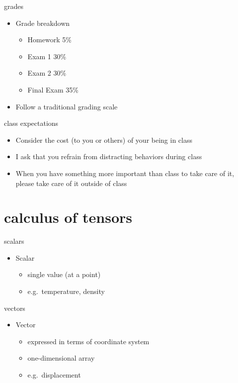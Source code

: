 \documentclass[
  letterpaper,
  ignorenonframetext,
  aspectratio=43,
  handout,
  12pt]{beamer}
\providecommand{\tightlist}{%
  \setlength{\itemsep}{0pt}\setlength{\parskip}{0pt}}
\providecommand{\tightlist}{%
\setlength{\itemsep}{0pt}\setlength{\parskip}{0pt}}
\begin{document}
\begin{frame}{grades}
\protect\hypertarget{grades}{}
\begin{itemize}
\tightlist
\item
  Grade breakdown

  \begin{itemize}
  \tightlist
  \item
    Homework 5\%
  \item
    Exam 1 30\%
  \item
    Exam 2 30\%
  \item
    Final Exam 35\%
  \end{itemize}
\item
  Follow a traditional grading scale
\end{itemize}
\end{frame}

\begin{frame}{class expectations}
\protect\hypertarget{class-expectations}{}
\begin{itemize}
\tightlist
\item
  Consider the cost (to you or others) of your being in class
\item
  I ask that you refrain from distracting behaviors during class
\item
  When you have something more important than class to take care of it,
  please take care of it outside of class
\end{itemize}
\end{frame}

\hypertarget{calculus-of-tensors}{%
\section{calculus of tensors}\label{calculus-of-tensors}}

\begin{frame}{scalars}
\protect\hypertarget{scalars}{}
\begin{itemize}
\tightlist
\item
  Scalar

  \begin{itemize}
  \tightlist
  \item
    single value (at a point)
  \item
    e.g.~temperature, density
  \end{itemize}
\end{itemize}
\end{frame}

\begin{frame}{vectors}
\protect\hypertarget{vectors}{}
\begin{itemize}
\tightlist
\item
  Vector

  \begin{itemize}
  \tightlist
  \item
    expressed in terms of coordinate system
  \item
    one-dimensional array
  \item
    e.g.~displacement
  \end{itemize}
\end{itemize}
\end{frame}
\end{document}
